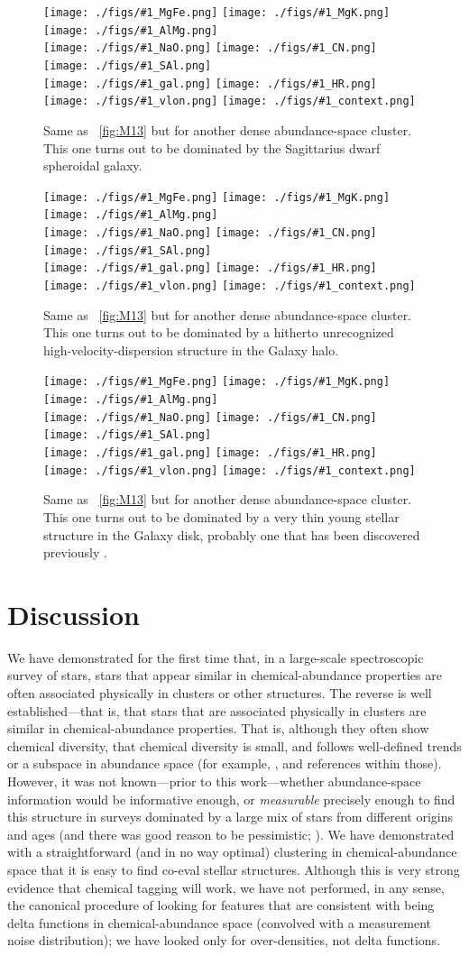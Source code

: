 \documentclass[12pt, letterpaper, preprint]{aastex}
\newcommand{\insanefigure}[1]{%
\texttt{[image: ./figs/\#1\_MgFe.png]}%
\texttt{[image: ./figs/\#1\_MgK.png]}%
\texttt{[image: ./figs/\#1\_AlMg.png]}\\
\texttt{[image: ./figs/\#1\_NaO.png]}%
\texttt{[image: ./figs/\#1\_CN.png]}%
\texttt{[image: ./figs/\#1\_SAl.png]}\\
\texttt{[image: ./figs/\#1\_gal.png]}%
\texttt{[image: ./figs/\#1\_HR.png]}\\
\texttt{[image: ./figs/\#1\_vlon.png]}%
\texttt{[image: ./figs/\#1\_context.png]}}
\begin{document}
\begin{figure}[!p]
\insanefigure{cluster_0256_0177}
\caption{Same as \figurename~\ref{fig:M13} but for another dense
  abundance-space cluster.
  This one turns out to be dominated by the Sagittarius dwarf spheroidal galaxy.\label{fig:Sgr}}
\end{figure}
\begin{figure}[!p]
\insanefigure{cluster_0256_0010}
\caption{Same as \figurename~\ref{fig:M13} but for another dense
  abundance-space cluster.
  This one turns out to be dominated by a hitherto unrecognized high-velocity-dispersion
  structure in the Galaxy halo.\label{fig:halo}}
\end{figure}
\begin{figure}[!p]
\insanefigure{cluster_0256_0141}
\caption{Same as \figurename~\ref{fig:M13} but for another dense
  abundance-space cluster.
  This one turns out to be dominated by a very thin young stellar
  structure in the Galaxy disk, probably one that has been discovered previously \citep{wegg}.\label{fig:disk}}
\end{figure}

\clearpage
\section{Discussion}\label{sec:discussion}

We have demonstrated for the first time that, in a large-scale
spectroscopic survey of stars, stars that appear similar in
chemical-abundance properties are often associated physically in
clusters or other structures.
The reverse is well established---that is, that stars that are
associated physically in clusters are similar in chemical-abundance
properties.
That is, although they often show chemical diversity, that chemical
diversity is small, and follows well-defined trends or a subspace in
abundance space (for example, \citealt{gratton, meszaros, bovy},
and references within those).
However, it was not known---prior to this work---whether abundance-space information would be
informative enough, or \emph{measurable} precisely enough to find this
structure in surveys dominated by a large mix of stars from different
origins and ages (and there was good reason to be pessimistic;
\citealt{ting}).
We have demonstrated with a straightforward (and in no way optimal)
clustering in chemical-abundance space that it is easy to find co-eval
stellar structures.
Although this is very strong evidence that chemical tagging will work,
we have not performed, in any sense, the canonical procedure of
looking for features that are consistent with being delta functions in
chemical-abundance space (convolved with a measurement noise
distribution); we have looked only for over-densities, not delta
functions.
\end{document}

